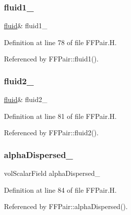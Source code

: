 \subsubsection{\texorpdfstring{fluid1\+\_\+}{fluid1\_}}
{\footnotesize\ttfamily \hyperlink{classFoam_1_1fluid}{fluid}\& fluid1\+\_\+\hspace{0.3cm}{\ttfamily [protected]}}



Definition at line 78 of file F\+F\+Pair.\+H.



Referenced by F\+F\+Pair\+::fluid1().

\mbox{\label{classFoam_1_1FFPair_afcd388bb44accdbfcf63b65301d6e760}} 
\subsubsection{\texorpdfstring{fluid2\+\_\+}{fluid2\_}}
{\footnotesize\ttfamily \hyperlink{classFoam_1_1fluid}{fluid}\& fluid2\+\_\+\hspace{0.3cm}{\ttfamily [protected]}}



Definition at line 81 of file F\+F\+Pair.\+H.



Referenced by F\+F\+Pair\+::fluid2().

\mbox{\label{classFoam_1_1FFPair_a892915169074a37515b3c4c0a0574d09}} 
\subsubsection{\texorpdfstring{alpha\+Dispersed\+\_\+}{alphaDispersed\_}}
{\footnotesize\ttfamily vol\+Scalar\+Field alpha\+Dispersed\+\_\+\hspace{0.3cm}{\ttfamily [protected]}}



Definition at line 84 of file F\+F\+Pair.\+H.



Referenced by F\+F\+Pair\+::alpha\+Dispersed().

